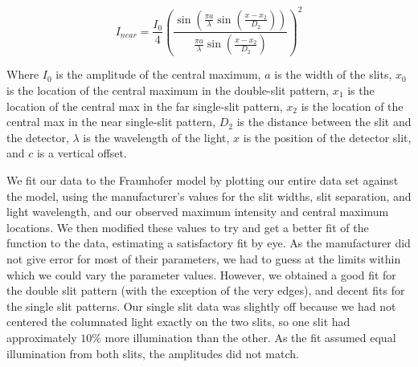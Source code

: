 \documentclass[prb,preprint]{revtex4-1}
\begin{document}
\begin{equation}
I_{near}= \frac{I_{0}}{4}(\frac{\sin(\frac{\pi a}{\lambda}\sin(\frac{x-x_{2}}{D_{2}}))}{\frac{\pi a}{\lambda}\sin(\frac{x-x_{2}}{D_{2}})})^{2} 
\end{equation}

Where $I_0$ is the amplitude of the central maximum, $a$ is the width of the slits, $x_0$ is the location of the central maximum in the double-slit pattern, $x_1$ is the location of the central max in the far single-slit pattern, $x_2$ is the location of the central max in the near single-slit pattern, $D_2$ is the distance between the slit and the detector, $\lambda$ is the wavelength of the light, $x$ is the position of the detector slit, and $c$ is a vertical offset. 

We fit our data to the Fraunhofer model by plotting our entire data set against the model, using the manufacturer's values for the slit widths, slit separation, and light wavelength, and our observed maximum intensity and central maximum locations.  We then modified these values to try and get a better fit of the function to the data, estimating a satisfactory fit by eye.  As the manufacturer did not give error for most of their parameters, we had to guess at the limits within which we could vary the parameter values.  However, we obtained a good fit for the double slit pattern (with the exception of the very edges), and decent fits for the single slit patterns.  Our single slit data was slightly off because we had not centered the columnated light exactly on the two slits, so one slit had approximately $10\%$ more illumination than the other.  As the fit assumed equal illumination from both slits, the amplitudes did not match.  
\end{document}
